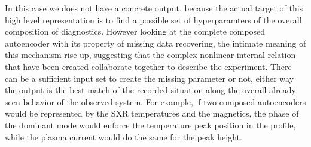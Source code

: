 In this case we does not have a concrete output, because the actual target of this high level representation is to find a possible set of hyperparamters of the overall composition of diagnostics. However looking at the complete composed autoencoder with its property of missing data recovering, the intimate meaning of this mechanism rise up, suggesting that the complex nonlinear internal relation that have been created collaborate together to describe the experiment. There can be a sufficient input set to create the missing parameter or not, either way the output is the best match of the recorded situation along the overall already seen behavior of the observed system.
For example, if two composed autoencoders would be represented by the SXR temperatures and the magnetics, the phase of the dominant mode would enforce the temperature peak position in the profile, while the plasma current would do the same for the peak height.
